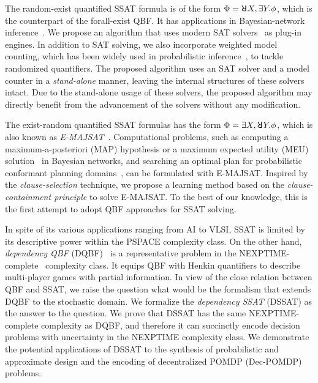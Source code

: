 The random-exist quantified SSAT formula is of the form $\Qf=\random{} X,\exists Y.\pf$, which is the counterpart of the forall-exist QBF.
It has applications in Bayesian-network inference~\cite{Cooper1990,Bacchus2003}.
We propose an algorithm that uses modern SAT solvers~\cite{Een2003Solver,Een2003Incremental} as plug-in engines.
In addition to SAT solving, we also incorporate weighted model counting, which has been widely used in probabilistic inference~\cite{Sang2005BayesianInference,Chavira2008}, to tackle randomized quantifiers.
The proposed algorithm uses an SAT solver and a model counter in a \textit{stand-alone} manner, leaving the internal structures of these solvers intact.
Due to the stand-alone usage of these solvers, the proposed algorithm may directly benefit from the advancement of the solvers without any modification.

The exist-random quantified SSAT formulas has the form $\Qf=\exists X,\random{} Y.\pf$,
which is also known as \textit{E-MAJSAT}~\cite{Littman1998}.
Computational problems, such as computing a maximum-a-posteriori (MAP) hypothesis or a maximum expected utility (MEU) solution~\cite{Dechter1998} in Bayesian networks,
and searching an optimal plan for probabilistic conformant planning domains~\cite{Littman1998},
can be formulated with E-MAJSAT.
Inspired by the \textit{clause-selection} technique,
we propose a learning method based on the \textit{clause-containment principle} to solve E-MAJSAT.
To the best of our knowledge, this is the first attempt to adopt QBF approaches for SSAT solving.

In spite of its various applications ranging from AI to VLSI,
SSAT is limited by its descriptive power within the PSPACE complexity class.
On the other hand, \textit{dependency QBF} (DQBF)~\cite{Balabanov2014,Scholl2018} is a representative problem in the NEXPTIME-complete~\cite{Peterson2001} complexity class.
It equips QBF with Henkin quantifiers to describe multi-player games with partial information.
In view of the close relation between QBF and SSAT,
we raise the question what would be the formalism that extends DQBF to the stochastic domain.
We formalize the \emph{dependency SSAT} (DSSAT) as the answer to the question.
We prove that DSSAT has the same NEXPTIME-complete complexity as DQBF,
and therefore it can succinctly encode decision problems with uncertainty in the NEXPTIME complexity class.
We demonstrate the potential applications of DSSAT to the synthesis of probabilistic and approximate design and the encoding of decentralized POMDP (Dec-POMDP)~\cite{Oliehoek2016} problems.

